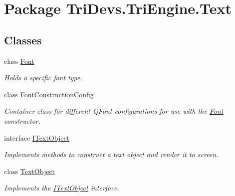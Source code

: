 \hypertarget{namespace_tri_devs_1_1_tri_engine_1_1_text}{\section{Package Tri\-Devs.\-Tri\-Engine.\-Text}
\label{namespace_tri_devs_1_1_tri_engine_1_1_text}
}
\subsection*{Classes}
\begin{DoxyCompactItemize}
\item 
class \hyperlink{class_tri_devs_1_1_tri_engine_1_1_text_1_1_font}{Font}
\begin{DoxyCompactList}\small\item\em Holds a specific font type. \end{DoxyCompactList}\item 
class \hyperlink{class_tri_devs_1_1_tri_engine_1_1_text_1_1_font_construction_config}{Font\-Construction\-Config}
\begin{DoxyCompactList}\small\item\em Container class for different Q\-Font configurations for use with the \hyperlink{class_tri_devs_1_1_tri_engine_1_1_text_1_1_font}{Font} constructor. \end{DoxyCompactList}\item 
interface \hyperlink{interface_tri_devs_1_1_tri_engine_1_1_text_1_1_i_text_object}{I\-Text\-Object}
\begin{DoxyCompactList}\small\item\em Implements methods to construct a text object and render it to screen. \end{DoxyCompactList}\item 
class \hyperlink{class_tri_devs_1_1_tri_engine_1_1_text_1_1_text_object}{Text\-Object}
\begin{DoxyCompactList}\small\item\em Implements the \hyperlink{interface_tri_devs_1_1_tri_engine_1_1_text_1_1_i_text_object}{I\-Text\-Object} interface. \end{DoxyCompactList}\end{DoxyCompactItemize}
